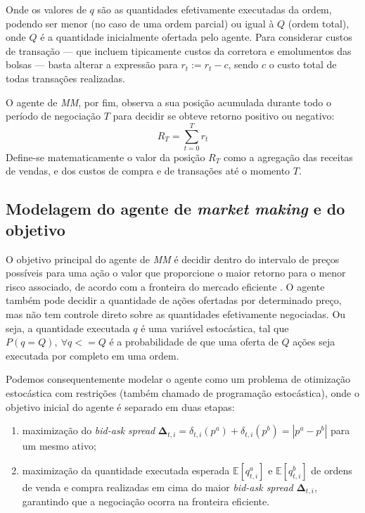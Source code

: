Onde os valores de  $q$ são as quantidades efetivamente executadas da ordem, podendo ser menor (no caso de uma ordem parcial) ou igual à $Q$ (ordem total), onde $Q$ é a quantidade inicialmente ofertada pelo agente.
Para considerar custos de transação — que incluem tipicamente custos da corretora e emolumentos das bolsas — basta alterar a expressão para $r_{t} := r_{t} - c$, sendo $c$ o custo total de todas transações realizadas.

O agente de \textit{MM}, por fim, observa a sua posição acumulada durante todo o período de negociação $T$ para decidir se obteve retorno positivo ou negativo:
\begin{equation} \label{return_accumulated}
    R_{T} = \sum_{t=0}^{T} r_t
\end{equation}
Define-se matematicamente o valor da posição $R_T$ como a agregação das receitas de vendas, e dos custos de compra e de transações até o momento $T$. 

\subsection{Modelagem do agente de \textit{market making} e do objetivo}
O objetivo principal do agente de \textit{MM} é decidir dentro do intervalo de preços possíveis para uma ação o valor que proporcione o maior retorno para o menor risco associado, de acordo com a fronteira do mercado eficiente \citep{markowitz1952}. O agente também pode decidir a quantidade de ações ofertadas por determinado preço, mas não tem controle direto sobre as quantidades efetivamente negociadas. Ou seja, a quantidade executada $q$ é uma variável estocástica, tal que $P(q = Q), \ \forall q <= Q$ é a probabilidade de que uma oferta de $Q$ ações seja executada por completo em uma ordem. 

Podemos consequentemente modelar o agente como um problema de otimização estocástica com restrições (também chamado de programação estocástica), onde o objetivo inicial do agente é separado em duas etapas: 

\begin{enumerate}[]
	\item maximização do \textit{bid-ask spread} $\mathbf{\Delta}_{t,i} = \delta_{t, i}(p^{a}) + \delta_{t, i}(p^{b}) = |p^{a} - p^{b}|$  para um mesmo ativo;
	
	\item maximização da quantidade executada esperada $\mathbb{E} [q_{t, i}^{a}]$ e $\mathbb{E} [q_{t, i}^{b}]$ de ordens de venda e compra realizadas em cima do maior \textit{bid-ask spread} $\mathbf{\Delta}_{t, i}$, garantindo que a negociação ocorra na fronteira eficiente.
\end{enumerate}

